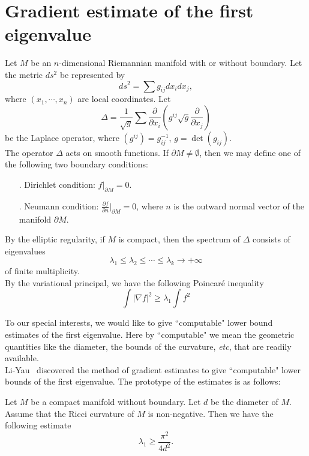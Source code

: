 \section{Gradient estimate of the first eigenvalue}


Let $M$ be an $n$-dimensional Riemannian manifold with or without boundary. Let
the metric $ds^2$ be represented by
\[
ds^2 = \sum g_{ij}dx_idx_j,
\]
where $(x_1,\cdots,x_n)$ are local coordinates. Let
\[
\Delta = \frac{1}{\sqrt{g}}\sum\frac{\partial}{\partial x_i}(g^{ij}\sqrt{g}
\frac{\partial}{\partial x_j})
\]
be the Laplace operator, where $(g^{ij})=g_{ij}^{-1}$, $g=\det (g_{ij})$.
\\

The operator $\Delta$ acts on smooth functions. If $\partial M \neq \emptyset$,
then we may define one of  the following two boundary conditions:
\begin{itemize}
\item[\ding{172}.] Dirichlet condition: $f|_{\partial M} = 0$.
\item[\ding{173}.] Neumann condition: 
$\frac{\partial f}{\partial n}|_{\partial M} = 0$, where $n$ is the outward
normal vector of the manifold $\partial M$.
\end{itemize}

By the elliptic regularity, if $M$ is compact, then the spectrum of $\Delta$
consists of eigenvalues
\[
\lambda_1 \leqslant \lambda_2 \leqslant \cdots \leqslant \lambda_k \rightarrow
+\infty
\]
of  finite multiplicity.
\\

By the variational principal, we have the following Poincar\'{e} inequality
\[
\int|\nabla f|^2 \geqslant \lambda_1\int f^2
\]

To our special interests, we would like to give
``computable" lower bound estimates of the first eigenvalue. Here by 
``computable" we mean the geometric quantities like the diameter, the bounds of 
the curvature, \textit{etc}, that are readily available.
\\

Li-Yau~\cite{li-yau} discovered the method of gradient estimates to give ``computable" lower
bounds of the first eigenvalue. The prototype of the estimates is as follows:
\begin{theorem}
[Li-Yau] Let $M$ be a compact manifold without boundary. Let $d$ be the diameter
of $M$. Assume that the Ricci curvature of $M$ is non-negative. Then we have
the following estimate
\[
\lambda_1 \geqslant \frac{\pi^2}{4d^2}.
\]
\end{theorem}


